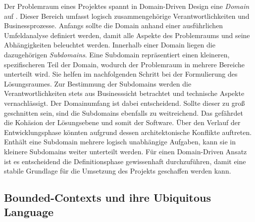 Der Problemraum eines Projektes spannt in Domain-Driven Design eine \emph{Domain} auf \cite[S. 56]{Vernon.2015}. Dieser Bereich umfasst logisch zusammengehörige Verantwortlichkeiten und Businessprozesse. Anfangs sollte die Domain anhand einer ausführlichen Umfeldanalyse definiert werden, damit alle Aspekte des Problemraums und seine Abhängigkeiten beleuchtet werden. Innerhalb einer Domain liegen die dazugehörigen \emph{Subdomains}. Eine Subdomain repräsentiert einen kleineren, spezifischeren Teil der Domain, wodurch der Problemraum in mehrere Bereiche unterteilt wird. Sie helfen im nachfolgenden Schritt bei der Formulierung des Lösungsraumes. Zur Bestimmung der Subdomains werden die Verantwortlichkeiten stets aus Businesssicht betrachtet und technische Aspekte vernachlässigt. Der Domainumfang ist dabei entscheidend. Sollte dieser zu groß geschnitten sein, sind die Subdomains ebenfalls zu weitreichend. Das gefährdet die Kohäsion der Lösungsebene und somit der Software. Über den Verlauf der Entwicklungsphase könnten aufgrund dessen architektonische Konflikte auftreten. Enthält eine Subdomain mehrere logisch unabhängige Aufgaben, kann sie in kleinere Subdomains weiter unterteilt werden. Für einen Domain-Driven Ansatz ist es entscheidend die Definitionsphase gewissenhaft durchzuführen, damit eine stabile Grundlage für die Umsetzung des Projekts geschaffen werden kann.

\pagebreak

\subsection{Bounded-Contexts und ihre Ubiquitous Language}

